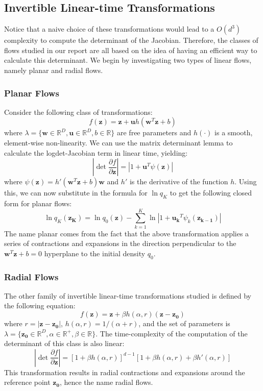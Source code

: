 \subsection*{Invertible Linear-time Transformations}
Notice that a naive choice of these transformations would lead to a $O(d^3)$ complexity to compute the determinant of the Jacobian. Therefore, the classes of flows studied in our report are all based on the idea of having an efficient way to calculate this determinant. We begin by investigating two types of linear flows, namely planar and radial flows. 

\subsubsection*{Planar Flows}
Consider the following class of transformations:
\[ f(\mathbf{z}) = \mathbf{z}+\mathbf{u}h(\mathbf{w}^T\mathbf{z}+b) \]
where $\lambda = \{ \mathbf{w} \in \mathbb{R}^D, \mathbf{u} \in \mathbb{R}^D, b \in \mathbb{R} \}$ are free parameters and $h(\cdot)$ is a smooth, element-wise non-linearity. We can use the matrix determinant lemma to calculate the logdet-Jacobian term in linear time, yielding:
\[ \left| \det \frac{\partial f}{\partial \mathbf{z}} \right| = \left| 1+\mathbf{u}^T\psi(\mathbf{z})\right| \]
where $\psi(\mathbf{z}) = h'(\mathbf{w}^T\mathbf{z}+b)\mathbf{w}$ and $h'$ is the derivative of the function $h$. Using this, we can now substitute in the formula for $\ln q_K$ to get the following closed form for planar flows:
\[ \ln q_K (\mathbf{z_K}) = \ln q_0(\mathbf{z}) - \sum_{k=1}^K \ln \left| 1+\mathbf{u_k}^T\psi_k(\mathbf{z_{k-1}})\right| \]
The name planar comes from the fact that the above transformation applies a series of contractions and expansions in the direction perpendicular to the $\mathbf{w}^T\mathbf{z}+b = 0$ hyperplane to the initial density $q_0$.

\subsubsection*{Radial Flows}
The other family of invertible linear-time transformations studied is defined by the following equation:
\[f(\mathbf{z}) = \mathbf{z} + \beta h(\alpha,r)(\mathbf{z}-\mathbf{z_0}) \]
where $r=\left| \mathbf{z}-\mathbf{z_0}\right|$, $h(\alpha,r) = 1/(\alpha+r)$, and the set of parameters is $\lambda = \{ \mathbf{z_0}\in \mathbb{R}^D, \alpha \in \mathbb{R} ^{+}, \beta \in \mathbb{R} \}$. The time-complexity of the computation of the determinant of this class is also linear:
\[ \left| \det \frac{\partial f}{\partial \mathbf{z}} \right| = [1+\beta h(\alpha ,r)]^{d-1}[1+\beta h(\alpha ,r)+\beta h'(\alpha ,r)] \] %
This transformation results in radial contractions and expansions around the reference point $\mathbf{z_0}$, hence the name radial flows.


